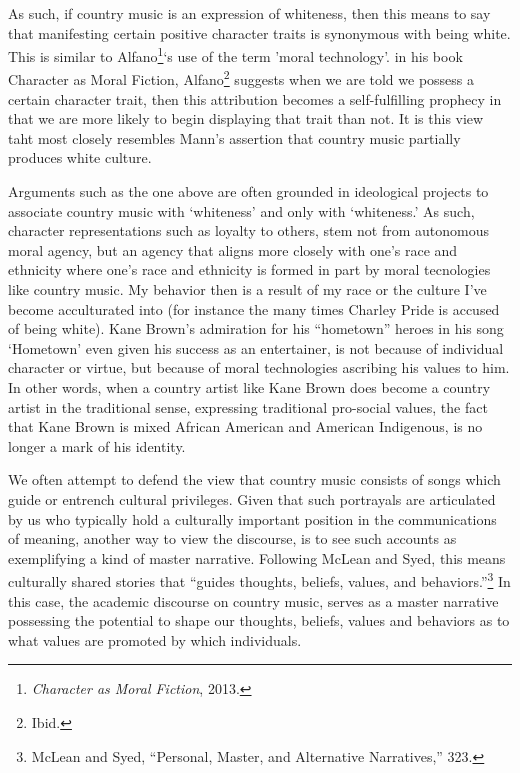 \documentclass[phdthesis,12pt,final]{wuthesis}
\theoremstyle{definition}
\theoremstyle{definition}
\theoremstyle{definition}
\theoremstyle{definition}
\theoremstyle{remark}
\begin{document}
As such, if country music is an expression of whiteness, then this means to say that manifesting certain positive character traits is synonymous with being white. This is similar to Alfano\footnote{\emph{Character as Moral Fiction}, 2013.}`s use of the term 'moral technology'. in his book Character as Moral Fiction, Alfano\footnote{Ibid.} suggests when we are told we possess a certain character trait, then this attribution becomes a self-fulfilling prophecy in that we are more likely to begin displaying that trait than not. It is this view taht most closely resembles Mann's assertion that country music partially produces white culture.

Arguments such as the one above are often grounded in ideological projects to associate country music with `whiteness' and only with `whiteness.' As such, character representations such as loyalty to others, stem not from autonomous moral agency, but an agency that aligns more closely with one's race and ethnicity where one's race and ethnicity is formed in part by moral tecnologies like country music. My behavior then is a result of my race or the culture I've become acculturated into (for instance the many times Charley Pride is accused of being white). Kane Brown's admiration for his ``hometown'' heroes in his song `Hometown' even given his success as an entertainer, is not because of individual character or virtue, but because of moral technologies ascribing his values to him. In other words, when a country artist like Kane Brown does become a country artist in the traditional sense, expressing traditional pro-social values, the fact that Kane Brown is mixed African American and American Indigenous, is no longer a mark of his identity.

We often attempt to defend the view that country music consists of songs which guide or entrench cultural privileges. Given that such portrayals are articulated by us who typically hold a culturally important position in the communications of meaning, another way to view the discourse, is to see such accounts as exemplifying a kind of master narrative. Following McLean and Syed, this means culturally shared stories that ``guides thoughts, beliefs, values, and behaviors.''\footnote{McLean and Syed, {``Personal, {Master}, and {Alternative Narratives},''} 323.} In this case, the academic discourse on country music, serves as a master narrative possessing the potential to shape our thoughts, beliefs, values and behaviors as to what values are promoted by which individuals.
\end{document}
